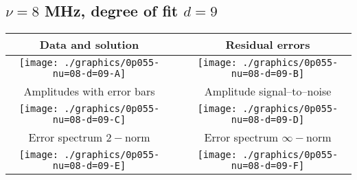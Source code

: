 

% 

\clearpage{}
\break{}

\subsection{$\nu = 8$ MHz, degree of fit $d = 9$}

\begin{table}[h]
    \begin{center}
        \begin{tabular}{ccc}
            Data and solution & \quad & Residual errors \\\hline
            \texttt{[image: ./graphics/0p055-nu=08-d=09-A]} &&
            \texttt{[image: ./graphics/0p055-nu=08-d=09-B]} \\[15pt]
            Amplitudes with error bars && Amplitude signal--to--noise \\\hline
            \texttt{[image: ./graphics/0p055-nu=08-d=09-C]} &&
            \texttt{[image: ./graphics/0p055-nu=08-d=09-D]} \\[15pt]
            Error spectrum $2-$norm && Error spectrum $\infty-$norm \\\hline
            \texttt{[image: ./graphics/0p055-nu=08-d=09-E]} &&
            \texttt{[image: ./graphics/0p055-nu=08-d=09-F]} \\[15pt]
        \end{tabular}
    \end{center}
\label{fig:elev=55, nu=8}
\end{table}



\endinput
